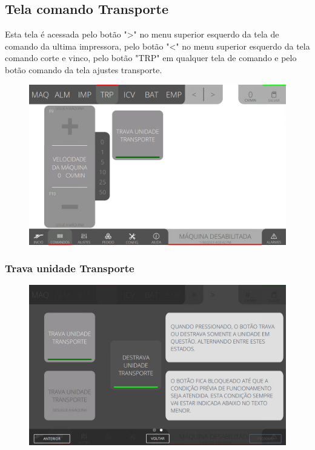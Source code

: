 \thispagestyle{fancy}
\vspace*{40 pt}
\subsection{Tela comando Transporte} \label{sec:telaComandoTransporte}
Esta tela é acessada pelo botão "\textgreater" no menu superior esquerdo da tela de comando da ultima impressora, pelo botão "\textless{}" no menu superior esquerdo da tela comando corte e vinco, pelo botão "TRP" em qualquer tela de comando e pelo botão comando da tela ajustes transporte.
\vspace*{\fill}
\begin{figure}[h]
    \centering
    \includegraphics[width=480 px,height=300 px]{src/imagesICV/05-transport/commands/e-Tela-Principal.png}
\end{figure}
\vspace*{\fill}


\newpage
\thispagestyle{fancy}
\vspace*{40 pt}
\subsubsection{\small{Trava unidade Transporte}} \label{sec:telaComandoTransporteTravaUnidadeTransporte}
\vspace*{\fill}
\begin{figure}[h]
    \centering
    \includegraphics[width=576 px,height=360 px]{src/imagesICV/05-transport/commands/e-2.png}
\end{figure}
\vspace*{\fill}